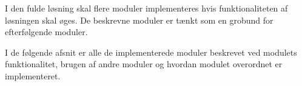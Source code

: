 I den fulde løsning skal flere moduler implementeres hvis funktionaliteten af løsningen skal øges. De beskrevne moduler er tænkt som en grobund for efterfølgende moduler.

I de følgende afsnit er alle de implementerede moduler beskrevet ved modulets funktionalitet, brugen af andre moduler og hvordan modulet overordnet er implementeret.









